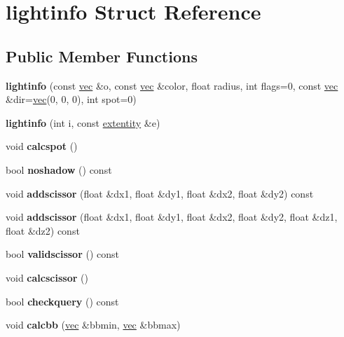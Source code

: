 \hypertarget{structlightinfo}{}\section{lightinfo Struct Reference}
\label{structlightinfo}
\subsection*{Public Member Functions}
\begin{DoxyCompactItemize}
\item 
\mbox{\label{structlightinfo_ace96a5e912d01efab10f324ce976c789}} 
{\bfseries lightinfo} (const \hyperlink{structvec}{vec} \&o, const \hyperlink{structvec}{vec} \&color, float radius, int flags=0, const \hyperlink{structvec}{vec} \&dir=\hyperlink{structvec}{vec}(0, 0, 0), int spot=0)
\item 
\mbox{\label{structlightinfo_a82776a3421bfaf52056cbcea14f98647}} 
{\bfseries lightinfo} (int i, const \hyperlink{structextentity}{extentity} \&e)
\item 
\mbox{\label{structlightinfo_a7f9a8cda37ffa9b125baf681c89a52d3}} 
void {\bfseries calcspot} ()
\item 
\mbox{\label{structlightinfo_ab1f0be72c0c1ab36dd86c5f6d360becf}} 
bool {\bfseries noshadow} () const
\item 
\mbox{\label{structlightinfo_a8e336b5b4d25fbe5b1ce8f04a9718dc4}} 
void {\bfseries addscissor} (float \&dx1, float \&dy1, float \&dx2, float \&dy2) const
\item 
\mbox{\label{structlightinfo_ace5fe1dbf377cabafd7fe7e0ec291fe7}} 
void {\bfseries addscissor} (float \&dx1, float \&dy1, float \&dx2, float \&dy2, float \&dz1, float \&dz2) const
\item 
\mbox{\label{structlightinfo_ab36b17d75413343ff4d1e26b87040ae3}} 
bool {\bfseries validscissor} () const
\item 
\mbox{\label{structlightinfo_aa19c02ff98f0c21062f08f42f4b021e3}} 
void {\bfseries calcscissor} ()
\item 
\mbox{\label{structlightinfo_a1f8e68d2401dc3c0c77e02c623d25e66}} 
bool {\bfseries checkquery} () const
\item 
\mbox{\label{structlightinfo_ad207f7c7bfb0772c57b23f615f0c6921}} 
void {\bfseries calcbb} (\hyperlink{structvec}{vec} \&bbmin, \hyperlink{structvec}{vec} \&bbmax)
\end{DoxyCompactItemize}
